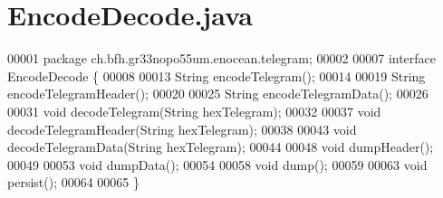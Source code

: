 \section{Encode\+Decode.\+java}
\label{EncodeDecode_8java_source}

\begin{DoxyCode}
00001 \textcolor{keyword}{package }ch.bfh.gr33nopo55um.enocean.telegram;
00002 
00007 \textcolor{keyword}{interface }EncodeDecode \{
00008 
00013     String encodeTelegram();
00014 
00019     String encodeTelegramHeader();
00020 
00025     String encodeTelegramData();
00026 
00031     \textcolor{keywordtype}{void} decodeTelegram(String hexTelegram);
00032 
00037     \textcolor{keywordtype}{void} decodeTelegramHeader(String hexTelegram);
00038 
00043     \textcolor{keywordtype}{void} decodeTelegramData(String hexTelegram);
00044 
00048     \textcolor{keywordtype}{void} dumpHeader();
00049 
00053     \textcolor{keywordtype}{void} dumpData();
00054 
00058     \textcolor{keywordtype}{void} dump();
00059 
00063     \textcolor{keywordtype}{void} persist();
00064 
00065 \}
\end{DoxyCode}
